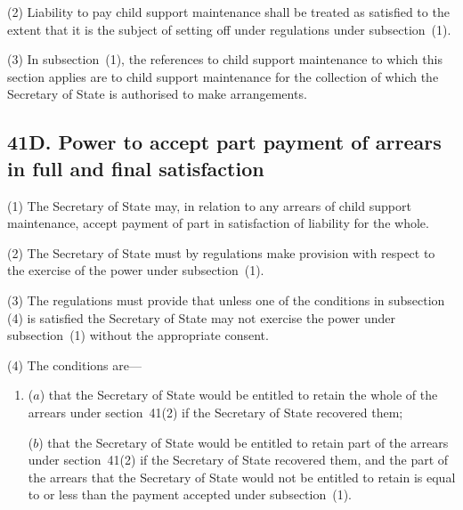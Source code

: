 \documentclass[12pt,a4paper]{article}
\begin{document}
(2)
Liability to pay child support maintenance shall be treated as satisfied to the extent that it is the subject of setting off under regulations under subsection~(1).

(3)
In subsection~(1), the references to child support maintenance to which this section applies are to child support maintenance for the collection of which the 
Secretary of State  %
is authorised to make arrangements.


\subsection{41D. Power to accept part payment of arrears in full and final satisfaction}

(1) The 
Secretary of State
may, in relation to any arrears of child support  maintenance, accept payment of part in satisfaction of liability for the whole.

(2)
The Secretary of State must by regulations make provision with respect to the exercise of the power under subsection~(1).

(3)
The regulations must provide that unless one of the conditions in subsection
(4)
is satisfied the 
Secretary of State %
may not exercise the power under subsection~(1) without the appropriate consent.

(4)
The conditions are---
\begin{enumerate}\item[]
($a$) that the 
Secretary of State %
would be entitled to retain the whole of the arrears under section~41(2) if 
the Secretary of State %
recovered them;

($b$) that the 
Secretary of State %
would be entitled to retain part of the arrears under section~41(2) if 
the Secretary of State %
recovered them, and the part of the arrears that the 
Secretary of State %
would not be entitled to retain is equal to or less than the payment accepted under subsection~(1).
\end{enumerate}
\end{document}
